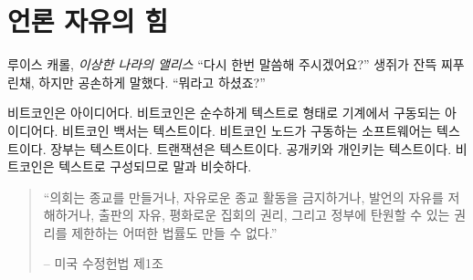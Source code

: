 \chapter{언론 자유의 힘}
\label{les:6}

\begin{chapquote}{루이스 캐롤, \textit{이상한 나라의 앨리스}}
\enquote{다시 한번 말씀해 주시겠어요?} 생쥐가 잔뜩 찌푸린채, 하지만 공손하게 말했다. \enquote{뭐라고 하셨죠?}
\end{chapquote}

비트코인은 아이디어다. 비트코인은 순수하게 텍스트로 형태로 기계에서 구동되는 아이디어다.
비트코인 백서는 텍스트이다. 비트코인 노드가 구동하는 소프트웨어는 텍스트이다. 장부는 텍스트이다. 
트랜잭션은 텍스트이다. 
공개키와 개인키는 텍스트이다.
비트코인은 텍스트로 구성되므로 말과 비슷하다.
\begin{quotation}\begin{samepage}
\enquote{의회는 종교를 만들거나, 자유로운 종교 활동을 금지하거나, 발언의 자유를 저해하거나, 
출판의 자유, 평화로운 집회의 권리, 그리고 정부에 탄원할 수 있는 권리를 제한하는 어떠한 법률도 
만들 수 없다.}
\begin{flushright} -- 미국 수정헌법 제1조
\end{flushright}\end{samepage}\end{quotation}

